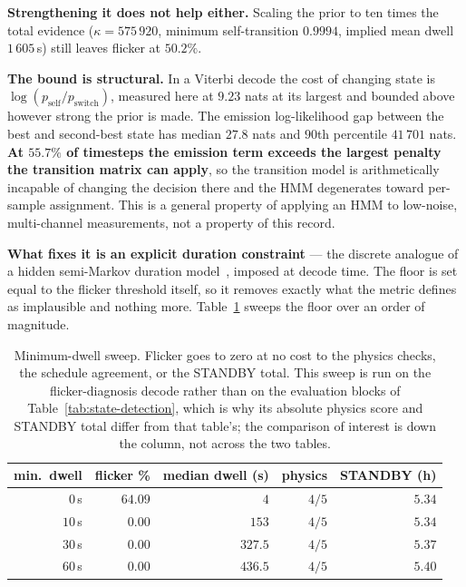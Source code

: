 \textbf{Strengthening it does not help either.} Scaling the prior to ten
times the total evidence ($\kappa=575\,920$, minimum self-transition
$0.9994$, implied mean dwell $1\,605$\,s) still leaves flicker at
$50.2\%$.

\textbf{The bound is structural.} In a Viterbi decode the cost of
changing state is $\log(p_{\text{self}}/p_{\text{switch}})$, measured
here at $9.23$ nats at its largest and bounded above however strong the
prior is made. The emission log-likelihood gap between the best and
second-best state has median $27.8$ nats and $90$th percentile
$41\,701$ nats. \textbf{At $55.7\%$ of timesteps the emission term
exceeds the largest penalty the transition matrix can apply}, so the
transition model is arithmetically incapable of changing the decision
there and the HMM degenerates toward per-sample assignment. This is a
general property of applying an HMM to low-noise, multi-channel
measurements, not a property of this record.

\textbf{What fixes it is an explicit duration constraint} --- the
discrete analogue of a hidden semi-Markov duration
model~\cite{yu2010hsmm}, imposed at decode time. The floor is set equal
to the flicker threshold itself, so it removes exactly what the metric
defines as implausible and nothing more.
Table~\ref{tab:min-dwell} sweeps the floor over an order of magnitude.

\begin{table}[t]
\centering
\caption{Minimum-dwell sweep. Flicker goes to zero at no cost to the
physics checks, the schedule agreement, or the STANDBY total. This
sweep is run on the flicker-diagnosis decode rather than on the
evaluation blocks of Table~\ref{tab:state-detection}, which is why its
absolute physics score and STANDBY total differ from that table's; the
comparison of interest is down the column, not across the two tables.}
\label{tab:min-dwell}
\small
\begin{tabular}{@{}rrrrr@{}}
\toprule
min.\ dwell & flicker \% & median dwell (s) & physics & STANDBY (h) \\
\midrule
$0$\,s  & $64.09$ & $4$   & $4/5$ & $5.34$ \\
$10$\,s & $\mathbf{0.00}$ & $153$ & $4/5$ & $5.34$ \\
$30$\,s & $0.00$ & $327.5$ & $4/5$ & $5.37$ \\
$60$\,s & $0.00$ & $436.5$ & $4/5$ & $5.40$ \\
\bottomrule
\end{tabular}
\end{table}

